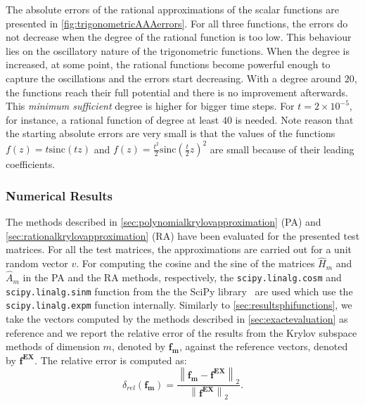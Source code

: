 The absolute errors of the rational approximations of the scalar functions are presented in
\autoref{fig:trigonometricAAAerrors}.
For all three functions, the errors do not decrease when the degree of the rational function is too low.
This behaviour lies on the oscillatory nature of the trigonometric functions. When the degree is increased,
at some point, the rational functions become powerful enough to capture the oscillations and the errors
start decreasing. With a degree around $20$, the functions reach their full potential and there is no
improvement afterwards. This \textit{minimum sufficient} degree is higher for bigger time steps.
For $t = 2 \times 10^{-5}$, for instance, a rational function of degree at least $40$ is needed.
Note reason that the starting absolute errors are very small is that the values of the functions
$f(z)=t \mathrm{sinc}(tz)$ and $f(z)=\frac{t^2}{2} \mathrm{sinc}(\frac{t}{2}z)^2$ are small because
of their leading coefficients.

\FloatBarrier

\subsubsection*{Numerical Results}

The methods described in \autoref{sec:polynomialkrylovapproximation} (PA)
and \autoref{sec:rationalkrylovapproximation} (RA) have been evaluated for the presented test matrices.
For all the test matrices, the approximations are carried out for a unit random vector $v$.
For computing the cosine and the sine of the matrices $\hat{H}_m$ and $\hat{A}_m$ in the PA and the
RA methods, respectively, the \texttt{scipy.linalg.cosm} and \texttt{scipy.linalg.sinm} function
from the the SciPy library~\cite{SciPy2020} are used which use the \texttt{scipy.linalg.expm}
function internally.
Similarly to \autoref{sec:resultsphifunctions}, we take the vectors computed by the methods
described in \autoref{sec:exactevaluation} as reference and we report the relative
error of the results from the Krylov subspace methods of dimension $m$, denoted by
$\mathbf{f_m}$, against the reference vectors, denoted by $\mathbf{f^{EX}}$.
The relative error is computed as:
\begin{equation*}
    \delta_{rel}(\mathbf{f_m}) =
    \frac{\left\| \mathbf{f_m} - \mathbf{f^{EX}} \right\|_2}
    {\left\| \mathbf{f^{EX}} \right\|_2}.
\end{equation*}

